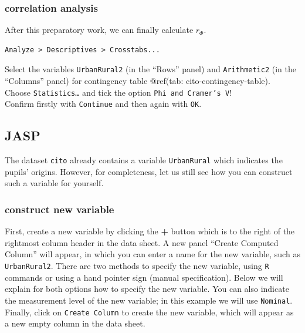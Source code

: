 \documentclass[
]{book}
\begin{document}
\hypertarget{correlation-analysis}{%
\subsubsection{correlation analysis}\label{correlation-analysis}}

After this preparatory work, we can finally calculate \(r_\Phi\).

\begin{verbatim}
Analyze > Descriptives > Crosstabs...
\end{verbatim}

Select the variables \texttt{UrbanRural2} (in the ``Rows'' panel) and \texttt{Arithmetic2}
(in the ``Columns'' panel) for
contingency table @ref(tab: cito-contingency-table).\\
Choose \texttt{Statistics…} and tick the option \texttt{Phi\ and\ Cramer’s\ V}!\\
Confirm firstly with \texttt{Continue} and then again with \texttt{OK}.

\hypertarget{jasp-9}{%
\subsection{JASP}\label{jasp-9}}

The dataset \texttt{cito} already contains a variable \texttt{UrbanRural} which indicates the pupils' origins.
However, for completeness, let us still see how you can construct such a variable for yourself.

\hypertarget{construct-new-variable-1}{%
\subsubsection{construct new variable}\label{construct-new-variable-1}}

First, create a new variable by clicking the \textbf{+} button which is to the right of the rightmost column header in the data sheet. A new panel ``Create Computed Column'' will appear, in which you can enter a name for the new variable, such as \texttt{UrbanRural2}.
There are two methods to specify the new variable, using \texttt{R} commands or using a hand pointer sign (manual specification). Below we will explain for both options how to specify the new variable. You can also indicate the measurement level of the new variable; in this example we will use \texttt{Nominal}. Finally, click on \texttt{Create\ Column} to create the new variable, which will appear as a new empty column in the data sheet.
\end{document}
